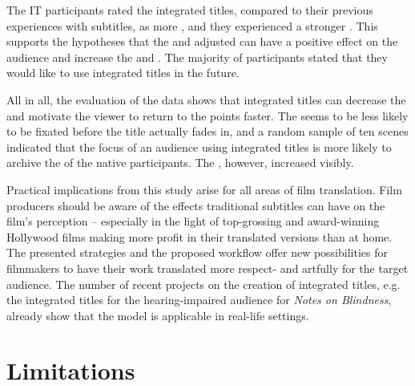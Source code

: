 The IT participants rated the integrated titles, compared to their previous experiences with subtitles, as more , and they experienced a stronger . This supports the hypotheses that the  and adjusted  can have a positive effect on the audience and increase the  and . The majority of participants stated that they would like to use integrated titles in the future.


All in all, the evaluation of the  data shows that integrated titles can decrease the  and motivate the viewer to return to the  points faster. The  seems to be less likely to be fixated before the title actually fades in, and a random sample of ten scenes indicated that the focus of an audience using integrated titles is more likely to archive the  of the native participants. The , however, increased visibly.



Practical implications from this study arise for all areas of film translation. Film producers should be aware of the effects traditional subtitles can have on the film’s perception – especially in the light of top-grossing and award-winning Hollywood films making more profit in their translated versions than at home. The presented strategies and the proposed workflow offer new possibilities for filmmakers to have their work translated more respect- and artfully for the target audience. The number of recent projects on the creation of integrated titles, e.g. the integrated titles for the hearing-impaired audience for \textit{Notes on Blindness}, already show that the model is applicable in real-life settings.


\section{Limitations}\label{sec:9.2}

